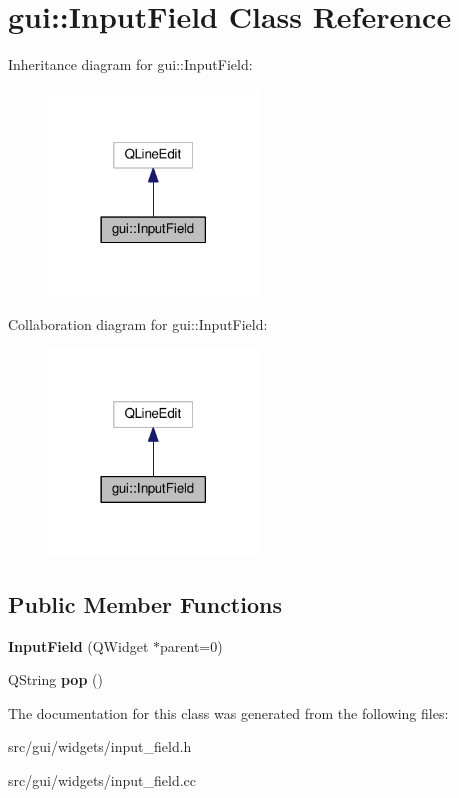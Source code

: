 \hypertarget{classgui_1_1InputField}{}\section{gui\+:\+:Input\+Field Class Reference}
\label{classgui_1_1InputField}


Inheritance diagram for gui\+:\+:Input\+Field\+:\nopagebreak
\begin{figure}[H]
\begin{center}
\leavevmode
\includegraphics[width=158pt]{classgui_1_1InputField__inherit__graph}
\end{center}
\end{figure}


Collaboration diagram for gui\+:\+:Input\+Field\+:\nopagebreak
\begin{figure}[H]
\begin{center}
\leavevmode
\includegraphics[width=158pt]{classgui_1_1InputField__coll__graph}
\end{center}
\end{figure}
\subsection*{Public Member Functions}
\begin{DoxyCompactItemize}
\item 
{\bfseries Input\+Field} (Q\+Widget $\ast$parent=0)\hypertarget{classgui_1_1InputField_a0b53d1085c2482fdb82d26e47b20efbf}{}\label{classgui_1_1InputField_a0b53d1085c2482fdb82d26e47b20efbf}

\item 
Q\+String {\bfseries pop} ()\hypertarget{classgui_1_1InputField_a620dafdd8938d46b726094b0ffece78e}{}\label{classgui_1_1InputField_a620dafdd8938d46b726094b0ffece78e}

\end{DoxyCompactItemize}


The documentation for this class was generated from the following files\+:\begin{DoxyCompactItemize}
\item 
src/gui/widgets/input\+\_\+field.\+h\item 
src/gui/widgets/input\+\_\+field.\+cc\end{DoxyCompactItemize}
